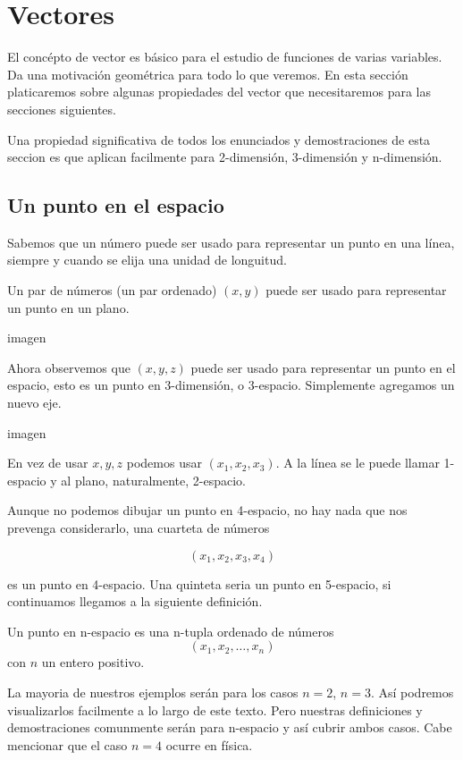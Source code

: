\chapter{Vectores}\label{ch:vectores}

El concépto de vector es básico para el estudio de funciones de varias variables. Da una motivación
geométrica para todo lo que veremos. En esta sección platicaremos sobre algunas propiedades del vector
que necesitaremos para las secciones siguientes.

Una propiedad significativa de todos los enunciados y demostraciones de esta seccion es que aplican
facilmente para 2-dimensión, 3-dimensión y n-dimensión.

\section{Un punto en el espacio}

Sabemos que un número puede ser usado para representar un punto en una línea, siempre y cuando se
elija una unidad de longuitud.

Un par de números (un par ordenado) $(x,y)$ puede ser usado para representar un punto en un plano.

imagen

Ahora observemos que $(x,y,z)$ puede ser usado para representar un punto en el espacio, esto es un
punto en 3-dimensión, o 3-espacio. Simplemente agregamos un nuevo eje.

imagen


En vez de usar $x,y,z$ podemos usar $(x_{1},x_{2},x_{3})$. A la línea se le puede llamar 1-espacio y
al plano, naturalmente, 2-espacio.

Aunque no podemos dibujar un punto en 4-espacio, no hay nada que nos prevenga considerarlo, una cuarteta
de números

$$(x_{1},x_{2},x_{3},x_{4})$$

es un punto en 4-espacio. Una quinteta seria un punto en 5-espacio, si continuamos llegamos a la siguiente
definición.

\begin{definition}
    Un punto en n-espacio es una n-tupla ordenado de números
    $$ (x_{1},x_{2}, \ldots ,x_{n}) $$
    con $n$ un entero positivo.
\end{definition}

La mayoria de nuestros ejemplos serán para los casos $n=2$, $n=3$. Así podremos visualizarlos facilmente a
lo largo de este texto. Pero nuestras definiciones y demostraciones comunmente serán para n-espacio y así
cubrir ambos casos. Cabe mencionar que el caso $n=4$ ocurre en física.

